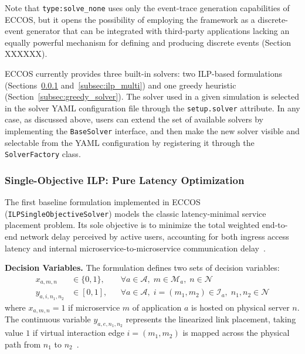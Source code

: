 \documentclass[ASNA]{USG} %
\begin{document}
Note that \texttt{type:solve\_none} uses only the event-trace generation capabilities of \textsc{ECCOS}, but it opens the possibility of employing the framework as a discrete-event generator that can be integrated with third-party applications lacking an equally powerful mechanism for defining and producing discrete events (Section XXXXXX).

\textsc{ECCOS} currently provides three built-in solvers: two ILP-based formulations (Sections~\ref{subsec:ilp_single} and~\ref{subsec:ilp_multi}) and one greedy heuristic (Section~\ref{subsec:greedy_solver}). The solver used in a given simulation is selected in the solver YAML configuration file through the \texttt{setup.solver} attribute. In any case, as discussed above, users can extend the set of available solvers by implementing the \texttt{BaseSolver} interface, and then make the new solver visible and selectable from the YAML configuration by registering it through the \texttt{SolverFactory} class.


\subsubsection{Single-Objective ILP: Pure Latency Optimization}
\label{subsec:ilp_single}

The first baseline formulation implemented in ECCOS (\texttt{ILPSingleObjectiveSolver}) models the classic latency-minimal service  placement problem. Its sole objective is to minimize the total weighted end-to-end network delay perceived by active users, accounting for both ingress access latency and internal microservice-to-microservice communication delay~\cite{Soumplis2024Performance}.

\textbf{Decision Variables.} The formulation defines two sets of decision variables:
\begin{align}
x_{a,m,n} &\in \{0, 1\}, && \forall a \in \mathcal{A}, \; m \in \mathcal{M}_a, \; n \in \mathcal{N} \\
y_{a,i,n_1,n_2} &\in [0, 1], && \forall a \in \mathcal{A}, \; i=(m_1,m_2) \in \mathcal{I}_a, \; n_1, n_2 \in \mathcal{N}
\end{align}
where $x_{a,m,n}=1$ if microservice $m$ of application $a$ is hosted on physical server $n$. The continuous variable $y_{a,e,n_1,n_2}$ represents the linearized link placement, taking value $1$ if virtual interaction edge $i=(m_1, m_2)$ is mapped across the physical path from $n_1$ to $n_2$~\cite{Taghavian2023An}.
\end{document}
